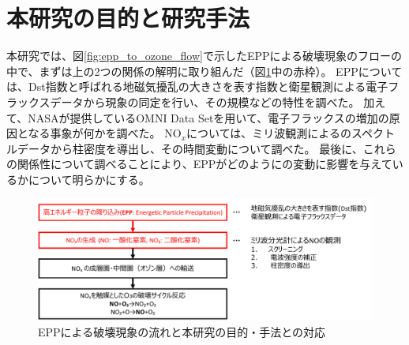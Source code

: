 \section{本研究の目的と研究手法}
\label{sec:intro_porpose}
本研究では、図\ref{fig:epp_to_ozone_flow}で示したEPPによる破壊現象のフローの中で、まずは上の2つの関係の解明に取り組んだ（図\ref{fig:flow_and_porpose}中の赤枠）。
EPPについては、Dst指数と呼ばれる地磁気擾乱の大きさを表す指数と衛星観測による電子フラックスデータから現象の同定を行い、その規模などの特性を調べた。
加えて、NASAが提供しているOMNI Data Setを用いて、電子フラックスの増加の原因となる事象が何かを調べた。
$\mathrm{NO}_x$については、ミリ波観測によるのスペクトルデータから柱密度を導出し、その時間変動について調べた。
最後に、これらの関係性について調べることにより、EPPがどのようにの変動に影響を与えているかについて明らかにする。
\begin{figure}[htbp]
    \centering
    \includegraphics[width=\linewidth]{master_thesis_contents/master_thesis_fig/flow_and_porpose.pdf}
    \caption{EPPによる破壊現象の流れと本研究の目的・手法との対応}
    \label{fig:flow_and_porpose}
\end{figure}

